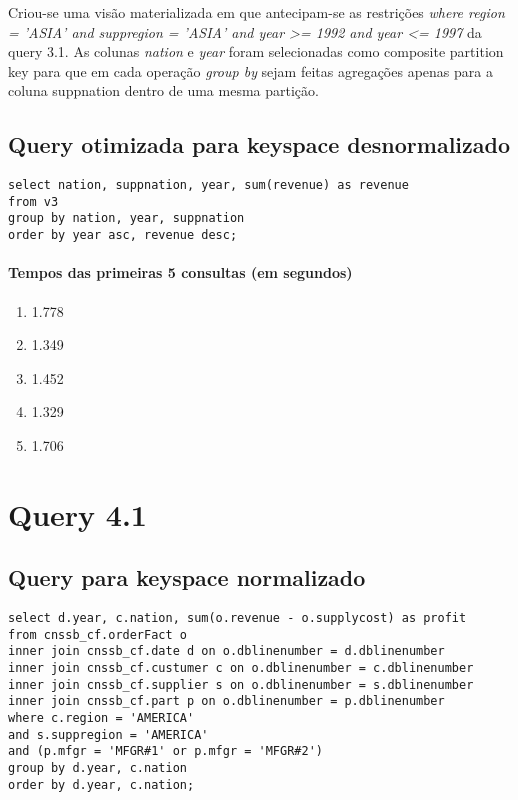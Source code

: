 \documentclass[12pt]{article}
\begin{document}
Criou-se uma visão materializada em que antecipam-se as restrições \emph{where region = 'ASIA' and suppregion = 'ASIA' and year \textgreater= 1992 and year \textless= 1997} da query 3.1. As colunas \emph{nation} e \emph{year} foram selecionadas como composite partition key para que em cada operação \emph{group by} sejam feitas agregações apenas para a coluna suppnation dentro de uma mesma partição.

\subsection{Query otimizada para keyspace desnormalizado}

\begin{lstlisting}
select nation, suppnation, year, sum(revenue) as revenue 
from v3
group by nation, year, suppnation
order by year asc, revenue desc; 
\end{lstlisting}

\paragraph{Tempos das primeiras 5 consultas (em segundos)}
\begin{enumerate}
\item 1.778
\item 1.349
\item 1.452
\item 1.329
\item 1.706
\end{enumerate}

\section{Query 4.1}

\subsection{Query para keyspace normalizado}

\begin{lstlisting}
select d.year, c.nation, sum(o.revenue - o.supplycost) as profit 
from cnssb_cf.orderFact o
inner join cnssb_cf.date d on o.dblinenumber = d.dblinenumber
inner join cnssb_cf.custumer c on o.dblinenumber = c.dblinenumber 
inner join cnssb_cf.supplier s on o.dblinenumber = s.dblinenumber
inner join cnssb_cf.part p on o.dblinenumber = p.dblinenumber 
where c.region = 'AMERICA'
and s.suppregion = 'AMERICA'
and (p.mfgr = 'MFGR#1' or p.mfgr = 'MFGR#2')
group by d.year, c.nation
order by d.year, c.nation;
\end{lstlisting}
\end{document}
